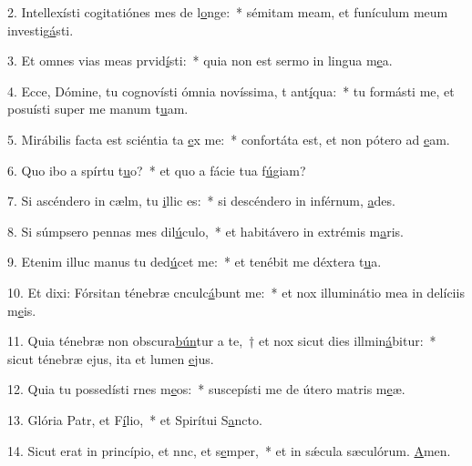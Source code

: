 2. Intellexísti cogitatiónes mes de l\uline{o}nge:~* sémitam meam, et funículum meum investig\uline{á}sti.\par 
3. Et omnes vias meas prvid\uline{í}sti:~* quia non est sermo in lingua m\uline{e}a.\par 
4. Ecce, Dómine, tu cognovísti ómnia novíssima, t ant\uline{í}qua:~* tu formásti me, et posuísti super me manum t\uline{u}am.\par 
5. Mirábilis facta est sciéntia ta \uline{e}x me:~* confortáta est, et non pótero ad \uline{e}am.\par 
6. Quo ibo a spírtu t\uline{u}o?~* et quo a fácie tua f\uline{ú}giam?\par 
7. Si ascéndero in cælm, tu \uline{i}llic es:~* si descéndero in inférnum, \uline{a}des.\par 
8. Si súmpsero pennas mes dil\uline{ú}culo,~* et habitávero in extrémis m\uline{a}ris.\par 
9. Etenim illuc manus tu ded\uline{ú}cet me:~* et tenébit me déxtera t\uline{u}a.\par 
10. Et dixi: Fórsitan ténebræ cnculc\uline{á}bunt me:~* et nox illuminátio mea in delíciis m\uline{e}is.\par 
11. Quia ténebræ non obscura\uline{bún}tur a te,~† et nox sicut dies illmin\uline{á}bitur:~* sicut ténebræ ejus, ita et lumen \uline{e}jus.\par 
12. Quia tu possedísti rnes m\uline{e}os:~* suscepísti me de útero matris m\uline{e}æ.\par 
13. Glória Patr, et F\uline{í}lio,~* et Spirítui S\uline{a}ncto.\par 
14. Sicut erat in princípio, et nnc, et s\uline{e}mper,~* et in sǽcula sæculórum. \uline{A}men.\par 
